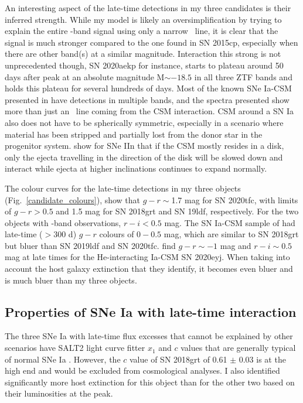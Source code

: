 \documentclass[a4paper,oneside,12pt, class=Latex/Classes/PhDthesisPSnPDF, crop=false]{standalone}
\begin{document}
An interesting aspect of the late-time detections in my three candidates is their inferred strength. While my model is likely an oversimplification by trying to explain the entire \ztfr-band signal using only a narrow \Halpha~line, it is clear that the signal is much stronger compared to the one found in SN 2015cp, especially when there are other band(s) at a similar magnitude. Interaction this strong is not unprecedented though, SN 2020aekp for instance, starts to plateau around 50 days after peak at an absolute magnitude M$\sim-18.5$ in all three ZTF bands \citep{Ia-CSM_BTS} and holds this plateau for several hundreds of days. Most of the known SNe Ia-CSM presented in \citet{Ia-CSM_BTS} have detections in multiple bands, and the spectra presented show more than just an \Halpha~line coming from the CSM interaction. CSM around a SN Ia also does not have to be spherically symmetric, especially in a scenario where material has been stripped and partially lost from the donor star in the progenitor system. \citet{PTF11iqb} show for SNe IIn that if the CSM mostly resides in a disk, only the ejecta travelling in the direction of the disk will be slowed down and interact while ejecta at higher inclinations continues to expand normally. 

The colour curves for the late-time detections in my three objects (Fig.~\ref{candidate_colours}), show that $g - r \sim$1.7 mag for SN 2020tfc, with limits of $g - r > 0.5$ and 1.5 mag for SN 2018grt and SN 19ldf, respectively.
For the two objects with \ztfi-band observations, $r-i<0.5$ mag. The SN Ia-CSM sample of \cite{Ia-CSM_BTS} had late-time ($>$300 d) $g - r$ colours of $0 - 0.5$ mag, which are similar to SN 2018grt but bluer than SN 2019ldf and SN 2020tfc. \citet{Kool_He_CSM} find $g-r\sim-1$ mag and $r-i\sim0.5$ mag at late times for the He-interacting Ia-CSM SN 2020eyj. When taking into account the host galaxy extinction that they identify, it becomes even bluer and is much bluer than my three objects.


\subsection{Properties of SNe Ia with late-time interaction}
\label{discuss_prop}
The three SNe Ia with late-time flux excesses that cannot be explained by other scenarios have SALT2 light curve fitter $x_1$ and $c$ values that are generally typical of normal SNe Ia \citep{DR2_Overview}. However, the $c$ value of SN 2018grt of 0.61 $\pm$ 0.03 is at the high end and would be excluded from cosmological analyses. I also identified significantly more host extinction for this object than for the other two based on their luminosities at the peak. 
\end{document}

